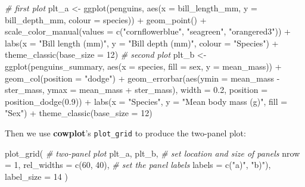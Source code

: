 \documentclass[
]{book}
\newenvironment{Shaded}{\begin{snugshade}}{\end{snugshade}}
\newcommand{\AttributeTok}[1]{\textcolor[rgb]{0.77,0.63,0.00}{#1}}
\newcommand{\CommentTok}[1]{\textcolor[rgb]{0.56,0.35,0.01}{\textit{#1}}}
\newcommand{\DecValTok}[1]{\textcolor[rgb]{0.00,0.00,0.81}{#1}}
\newcommand{\FloatTok}[1]{\textcolor[rgb]{0.00,0.00,0.81}{#1}}
\newcommand{\FunctionTok}[1]{\textcolor[rgb]{0.00,0.00,0.00}{#1}}
\newcommand{\NormalTok}[1]{#1}
\newcommand{\OtherTok}[1]{\textcolor[rgb]{0.56,0.35,0.01}{#1}}
\newcommand{\SpecialCharTok}[1]{\textcolor[rgb]{0.00,0.00,0.00}{#1}}
\newcommand{\StringTok}[1]{\textcolor[rgb]{0.31,0.60,0.02}{#1}}
\begin{document}
\begin{Shaded}
\begin{Highlighting}[]
\CommentTok{\# first plot}
\NormalTok{plt\_a }\OtherTok{\textless{}{-}} 
  \FunctionTok{ggplot}\NormalTok{(penguins, }
         \FunctionTok{aes}\NormalTok{(}\AttributeTok{x =}\NormalTok{ bill\_length\_mm, }\AttributeTok{y =}\NormalTok{ bill\_depth\_mm, }\AttributeTok{colour =}\NormalTok{ species)) }\SpecialCharTok{+} 
  \FunctionTok{geom\_point}\NormalTok{() }\SpecialCharTok{+} 
  \FunctionTok{scale\_color\_manual}\NormalTok{(}\AttributeTok{values =} \FunctionTok{c}\NormalTok{(}\StringTok{"cornflowerblue"}\NormalTok{, }\StringTok{"seagreen"}\NormalTok{, }\StringTok{"orangered3"}\NormalTok{)) }\SpecialCharTok{+}
  \FunctionTok{labs}\NormalTok{(}\AttributeTok{x =} \StringTok{"Bill length (mm)"}\NormalTok{, }\AttributeTok{y =} \StringTok{"Bill depth (mm)"}\NormalTok{, }\AttributeTok{colour =} \StringTok{"Species"}\NormalTok{) }\SpecialCharTok{+}
  \FunctionTok{theme\_classic}\NormalTok{(}\AttributeTok{base\_size =} \DecValTok{12}\NormalTok{)}
\CommentTok{\# second plot}
\NormalTok{plt\_b }\OtherTok{\textless{}{-}} 
  \FunctionTok{ggplot}\NormalTok{(penguins\_summary, }
         \FunctionTok{aes}\NormalTok{(}\AttributeTok{x =}\NormalTok{ species, }\AttributeTok{fill =}\NormalTok{ sex, }\AttributeTok{y =}\NormalTok{ mean\_mass)) }\SpecialCharTok{+} 
  \FunctionTok{geom\_col}\NormalTok{(}\AttributeTok{position =} \StringTok{"dodge"}\NormalTok{) }\SpecialCharTok{+} 
  \FunctionTok{geom\_errorbar}\NormalTok{(}\FunctionTok{aes}\NormalTok{(}\AttributeTok{ymin =}\NormalTok{ mean\_mass }\SpecialCharTok{{-}}\NormalTok{ ster\_mass, }\AttributeTok{ymax =}\NormalTok{ mean\_mass }\SpecialCharTok{+}\NormalTok{ ster\_mass), }
                \AttributeTok{width =} \FloatTok{0.2}\NormalTok{, }\AttributeTok{position =} \FunctionTok{position\_dodge}\NormalTok{(}\FloatTok{0.9}\NormalTok{)) }\SpecialCharTok{+} 
  \FunctionTok{labs}\NormalTok{(}\AttributeTok{x =} \StringTok{"Species"}\NormalTok{, }\AttributeTok{y =} \StringTok{"Mean body mass (g)"}\NormalTok{, }\AttributeTok{fill =} \StringTok{"Sex"}\NormalTok{) }\SpecialCharTok{+}
  \FunctionTok{theme\_classic}\NormalTok{(}\AttributeTok{base\_size =} \DecValTok{12}\NormalTok{)}
\end{Highlighting}
\end{Shaded}

Then we use \textbf{cowplot}'s \texttt{plot\_grid} to produce the two-panel plot:

\begin{Shaded}
\begin{Highlighting}[]
\FunctionTok{plot\_grid}\NormalTok{(}
  \CommentTok{\# two{-}panel plot}
\NormalTok{  plt\_a, plt\_b, }
  \CommentTok{\# set location and size of panels}
  \AttributeTok{nrow =} \DecValTok{1}\NormalTok{, }\AttributeTok{rel\_widths =} \FunctionTok{c}\NormalTok{(}\DecValTok{60}\NormalTok{, }\DecValTok{40}\NormalTok{), }
  \CommentTok{\# set the panel labels}
  \AttributeTok{labels =} \FunctionTok{c}\NormalTok{(}\StringTok{"a)"}\NormalTok{, }\StringTok{"b)"}\NormalTok{), }\AttributeTok{label\_size =} \DecValTok{14}
\NormalTok{)}
\end{Highlighting}
\end{Shaded}
\end{document}
